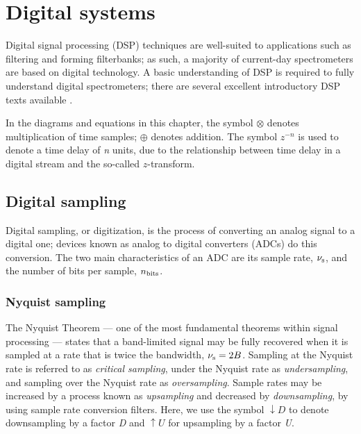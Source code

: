 \documentclass{ws-rv961x669}
\begin{document}

\section{Digital systems}

Digital signal processing (DSP) techniques are well-suited to applications such as filtering and forming filterbanks; as such, a majority of current-day spectrometers are based on digital technology. A basic understanding of DSP is required to fully understand digital spectrometers; there are several excellent introductory DSP texts available \cite{Lyons:2000uy, BookSmithFFT}. 

In the diagrams and equations in this chapter, the symbol $\otimes$ denotes multiplication of time samples; $\oplus$ denotes addition. The symbol $z^{-n}$ is used to denote a time delay of \emph{n} units, due to the relationship between time delay in a digital stream and the so-called $z$-transform.

\subsection{Digital sampling}

Digital sampling, or digitization, is the process of converting an analog signal to a digital one; devices known as analog to digital converters (ADCs) do this conversion. The two main characteristics of an ADC are its sample rate, $\nu_{\rm{s}}$, and the number of bits per sample, $n_{\rm{bits}}$.

\subsubsection{Nyquist sampling \label{sub:sampling}}

The Nyquist Theorem --- one of the most fundamental theorems within signal processing --- states that a band-limited signal may be fully recovered when it is sampled at a rate that is twice the bandwidth, $\nu_{\rm{s}} = 2 B$. 
Sampling at the  Nyquist rate is referred to as \emph{critical sampling}, under the Nyquist rate as \emph{undersampling}, and sampling over the Nyquist rate as \emph{oversampling}. Sample rates may be increased by a process known as \emph{upsampling} and decreased by \emph{downsampling}, by using sample rate conversion filters. Here, we use the symbol $\downarrow D$ to denote downsampling by a factor \emph{D} and $\uparrow U$ for upsampling by a factor \emph{U}.
\end{document}
